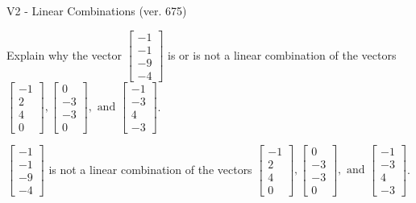 \begin{exercise}
  \begin{exerciseTitle}V2 - Linear Combinations (ver. 675)\end{exerciseTitle}
  \begin{exerciseStatement}
    Explain why the vector \(\left[\begin{array}{c}
-1 \\
-1 \\
-9 \\
-4
\end{array}\right]\)  is or is not a linear 
	combination of the vectors \(\left[\begin{array}{c}
-1 \\
2 \\
4 \\
0
\end{array}\right] , \left[\begin{array}{c}
0 \\
-3 \\
-3 \\
0
\end{array}\right] , \text{ and } \left[\begin{array}{c}
-1 \\
-3 \\
4 \\
-3
\end{array}\right]\).
	


  \end{exerciseStatement}
  \begin{exerciseAnswer}
   \(\left[\begin{array}{c}
-1 \\
-1 \\
-9 \\
-4
\end{array}\right]\) 
  	 is not  
	a linear combination of the vectors \(\left[\begin{array}{c}
-1 \\
2 \\
4 \\
0
\end{array}\right] , \left[\begin{array}{c}
0 \\
-3 \\
-3 \\
0
\end{array}\right] , \text{ and } \left[\begin{array}{c}
-1 \\
-3 \\
4 \\
-3
\end{array}\right]\).

	
  


  \end{exerciseAnswer}
\end{exercise}